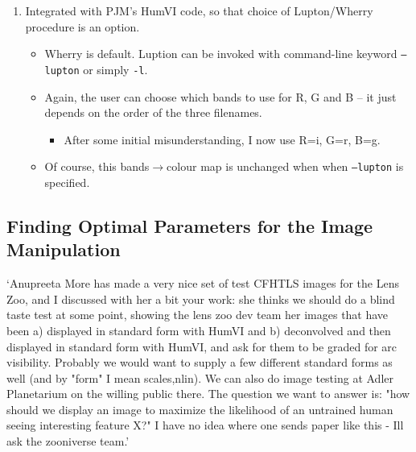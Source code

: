 \documentclass[letterpaper, 11pt]{article}
\def\MORE{{\color{red}{\bf MORE}}\xspace}
\begin{document}
\begin{enumerate}
\begin{itemize}
	\end{itemize}
	\item Integrated with PJM's HumVI code, so that choice of Lupton/Wherry procedure is an option.
	\begin{itemize}
		\item Wherry is default. Luption can be invoked with command-line keyword \texttt{--lupton} or simply \texttt{-l}.
		\item Again, the user can choose which bands to use for R, G and B -- it just depends on the order of the three filenames.
		\begin{itemize}
			\item After some initial misunderstanding, I now use R=i, G=r, B=g.
		\end{itemize}
		\item Of course, this bands$\rightarrow$colour map is unchanged when when \texttt{--lupton} is specified.
	\end{itemize}
\end{enumerate}



\subsection{Finding Optimal Parameters for the Image Manipulation}

`Anupreeta More has made a very nice set of test CFHTLS images for the
Lens Zoo, and I discussed with her a bit your work: she thinks we
should do a blind taste test at some point, showing the lens zoo dev
team her images that have been a) displayed in standard form with
HumVI and b) deconvolved and then
displayed in standard form with HumVI, and ask for them to be graded
for arc visibility. Probably we would want to supply a few different
standard forms as well (and by "form" I mean {scales,nlin}). We can
also do image testing at Adler Planetarium on the willing public
there. The question we want to answer is: "how should we display an
image to maximize the likelihood of an untrained human seeing
interesting feature X?"  I have no idea where one sends paper like
this - Ill ask the zooniverse team.'
\end{document}
